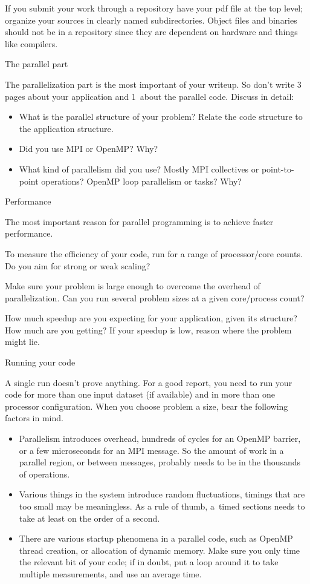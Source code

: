 If you submit your work through a repository
have your pdf file at the top level;
organize your sources in clearly named subdirectories.
Object files and binaries should not be in a repository
since they are dependent on hardware and things like compilers.

 {The parallel part}

The parallelization part is the most important of your writeup.
So don't write 3 pages about your application and 1~about the parallel code.
Discuss in detail:
\begin{itemize}
\item What is the parallel structure of your problem?
  Relate the code structure to the application structure.
\item Did you use MPI or OpenMP? Why?
\item What kind of parallelism did you use? Mostly MPI collectives or point-to-point operations?
  OpenMP loop parallelism or tasks? Why?
\end{itemize}

 {Performance}

The most important reason for parallel programming
is to achieve faster performance.

To measure the efficiency of your code, 
run for a range of processor/core counts.
Do you aim for strong or weak scaling?

Make sure your problem is large enough to overcome
the overhead of parallelization.
Can you run several problem sizes at a given core/process count?

How much speedup are you expecting for your application,
given its structure?
How much are you getting?
If your speedup is low, reason where the problem might lie.

 {Running your code}

A single run doesn't prove anything. For a good report, you need to
run your code for more than one input dataset (if available) and in
more than one processor configuration.
When you choose problem a size,
bear the following factors in mind.
\begin{itemize}
\item Parallelism introduces overhead, hundreds of cycles for an OpenMP barrier,
  or a few microseconds for an MPI message. So the amount of work in a parallel region,
  or between messages, probably needs to be in the thousands of operations.
\item Various things in the system introduce random fluctuations,
  timings that are too small may be meaningless.
  As a rule of thumb, a~timed sections needs to take
  at least on the order of a second.
\item There are various startup phenomena in a parallel code,
  such as OpenMP thread creation, or allocation of dynamic memory.
  Make sure you only time the relevant bit of your code;
  if in doubt, put a loop around it to take multiple measurements,
  and use an average time.
\end{itemize}

